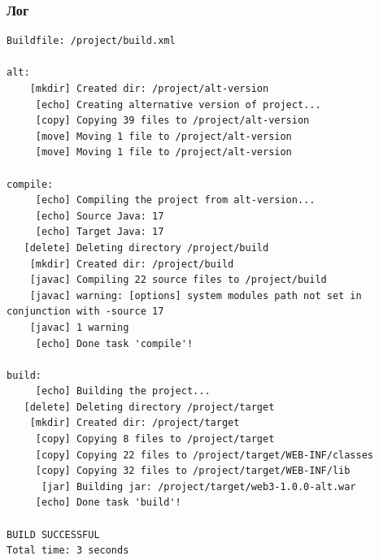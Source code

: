 \subsubsection{Лог}

\begin{lstlisting}[caption={Лог цели \texttt{alt}},language={},captionpos=b]
Buildfile: /project/build.xml

alt:
    [mkdir] Created dir: /project/alt-version
     [echo] Creating alternative version of project...
     [copy] Copying 39 files to /project/alt-version
     [move] Moving 1 file to /project/alt-version
     [move] Moving 1 file to /project/alt-version

compile:
     [echo] Compiling the project from alt-version...
     [echo] Source Java: 17
     [echo] Target Java: 17
   [delete] Deleting directory /project/build
    [mkdir] Created dir: /project/build
    [javac] Compiling 22 source files to /project/build
    [javac] warning: [options] system modules path not set in conjunction with -source 17
    [javac] 1 warning
     [echo] Done task 'compile'!

build:
     [echo] Building the project...
   [delete] Deleting directory /project/target
    [mkdir] Created dir: /project/target
     [copy] Copying 8 files to /project/target
     [copy] Copying 22 files to /project/target/WEB-INF/classes
     [copy] Copying 32 files to /project/target/WEB-INF/lib
      [jar] Building jar: /project/target/web3-1.0.0-alt.war
     [echo] Done task 'build'!

BUILD SUCCESSFUL
Total time: 3 seconds
\end{lstlisting}